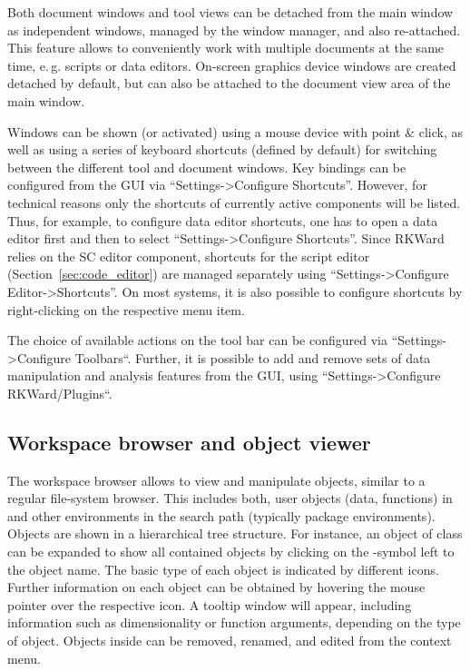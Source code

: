 Both document windows and tool views can be detached from the main
window as independent windows, managed by the window manager, and also
re-attached. This feature allows to conveniently work with multiple documents
at the same time, e.\,g. scripts or data editors. On{}-screen
graphics device windows are created detached by default, but can also
be attached to the document view area of the main window.

Windows can be shown (or activated) using a mouse device with point \&
click, as well as using a series of keyboard shortcuts (defined by
default) for switching between the different tool and document windows.
Key bindings can be configured from the GUI via ``Settings->Configure Shortcuts''.
However, for technical reasons only the shortcuts of currently active components
will be listed. Thus, for example, to
configure data editor shortcuts, one has to open a data editor first and
then to select ``Settings->Configure Shortcuts''. Since RKWard relies on the
 SC editor component,
shortcuts for the script editor (Section~\ref{sec:code_editor}) are managed separately using
``Settings->Configure Editor->Shortcuts''. On most systems, it is also
possible to configure shortcuts by right-clicking on the respective
menu item.

The choice of available actions on the tool bar can be
configured via ``Settings->Configure Toolbars``. Further, it is possible to add and remove sets
of data manipulation and analysis features from the GUI, using
``Settings->Configure RKWard/Plugins``.

\subsection{Workspace browser and object viewer}
\label{sec:workspace_browser_object_viewer}

The workspace browser allows to view
and manipulate  objects, similar
to a regular file-system browser. This includes both, user objects
(data, functions) in  and other environments in the
 search path (typically
 package environments). Objects are shown
in a hierarchical tree structure. For instance, an object of class
 can be expanded to show all contained objects
by clicking on the \proglang{+}-symbol left to the object name.
The basic type of each object is indicated by different icons. Further
information on each object can be obtained by hovering the mouse
pointer over the respective icon. A tooltip window will appear,
including information such as dimensionality or function arguments,
depending on the type of object. Objects inside  can be
removed, renamed, and edited from the context menu.

